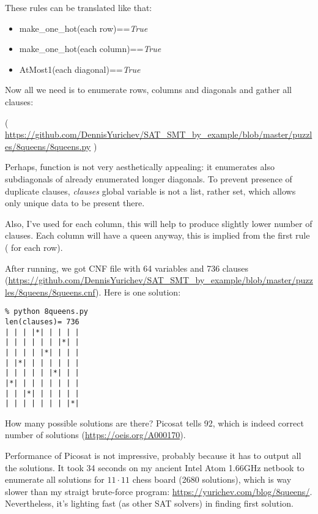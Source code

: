 These rules can be translated like that:

\begin{itemize}
\item make\_one\_hot(each row)==\textit{True}

\item make\_one\_hot(each column)==\textit{True}

\item AtMost1(each diagonal)==\textit{True}
\end{itemize}

Now all we need is to enumerate rows, columns and diagonals and gather all clauses:


( \url{https://github.com/DennisYurichev/SAT_SMT_by_example/blob/master/puzzles/8queens/8queens.py} )

Perhaps,  function is not very aesthetically appealing: it enumerates also subdiagonals
of already enumerated longer diagonals.
To prevent presence of duplicate clauses, \textit{clauses} global variable is not a list, rather set, which allows
only unique data to be present there.

Also, I've used  for each column, this will help to produce slightly lower number of clauses.
Each column will have a queen anyway, this is implied from the first rule ( for each row).

After running, we got CNF file with 64 variables and 736 clauses (\url{https://github.com/DennisYurichev/SAT_SMT_by_example/blob/master/puzzles/8queens/8queens.cnf}).
Here is one solution:

\begin{lstlisting}
% python 8queens.py
len(clauses)= 736
| | | |*| | | | |
| | | | | | |*| |
| | | | |*| | | |
| |*| | | | | | |
| | | | | |*| | |
|*| | | | | | | |
| | |*| | | | | |
| | | | | | | |*|
\end{lstlisting}

How many possible solutions are there?
Picosat tells 92, which is indeed correct number of solutions (\url{https://oeis.org/A000170}).

Performance of Picosat is not impressive, probably because it has to output all the solutions.
It took 34 seconds on my ancient Intel Atom 1.66GHz netbook to enumerate all solutions for $11 \cdot 11$ chess board
(2680 solutions),
which is way slower than my straigt brute-force program: \url{https://yurichev.com/blog/8queens/}.
Nevertheless, it's lighting fast (as other SAT solvers) in finding first solution.

